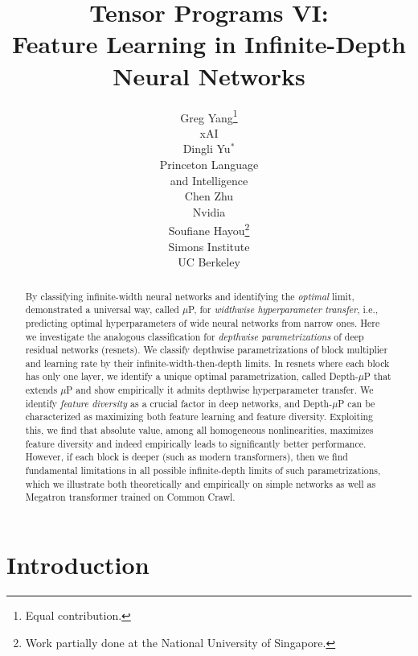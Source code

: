 \documentclass{article}
\title{Tensor Programs VI: \\ Feature Learning in Infinite-Depth Neural Networks}
\author{%
  Greg Yang\thanks{Equal contribution.} \\
  xAI\\
  \And
  Dingli Yu$^*$\\
  Princeton Language\\ and Intelligence\\
  \And
  Chen Zhu \\
  Nvidia\\
  \And 
  Soufiane Hayou\thanks{Work partially done at the National University of Singapore.} \\
  Simons Institute\\ UC Berkeley\\
}
\theoremstyle{plain}
\theoremstyle{definition}
\begin{document}
\maketitle

\begin{abstract}

By classifying infinite-width neural networks and identifying the \emph{optimal} limit, \cite{yang2021tensor,yang2022tensor} demonstrated a universal way, called $\mu$P, for \emph{widthwise hyperparameter transfer}, i.e., predicting optimal hyperparameters of wide neural networks from narrow ones.
Here we investigate the analogous classification for \emph{depthwise parametrizations} of deep residual networks (resnets). 
We classify depthwise parametrizations of block multiplier and learning rate by their infinite-width-then-depth limits.
In resnets where each block has only one layer, we identify a unique optimal parametrization, called Depth-$\mu$P that extends $\mu$P and show empirically it admits depthwise hyperparameter transfer.
We identify \emph{feature diversity} as a crucial factor in deep networks, and  Depth-$\mu$P can be characterized as maximizing both feature learning and feature diversity.
Exploiting this, we find that absolute value, among all homogeneous nonlinearities,  maximizes feature diversity and indeed empirically leads to significantly better performance.
However, if each block is deeper (such as modern transformers), then we find fundamental limitations in all possible infinite-depth limits of such parametrizations, which we illustrate both theoretically and empirically on simple networks as well as Megatron transformer trained on Common Crawl.

\end{abstract} 
\section{Introduction}
\end{document}
